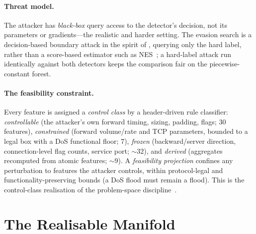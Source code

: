\documentclass[10pt,twocolumn]{article}
\begin{document}
\paragraph{Threat model.}
The attacker has \emph{black-box} query access to the detector's decision, not its
parameters or gradients---the realistic and harder setting. The evasion search is
a decision-based boundary attack in the spirit of
\cite{brendel2018boundary,chen2020hopskipjump}, querying only the hard label,
rather than a score-based estimator such as NES~\cite{ilyas2018blackbox}; a
hard-label attack run identically against both detectors keeps the comparison
fair on the piecewise-constant forest.

\paragraph{The feasibility constraint.}
Every feature is assigned a \emph{control class} by a header-driven rule
classifier: \emph{controllable} (the attacker's own forward timing, sizing,
padding, flags; $30$ features), \emph{constrained} (forward volume/rate and TCP
parameters, bounded to a legal box with a DoS functional floor; $7$),
\emph{frozen} (backward/server direction, connection-level flag counts, service
port; $\sim$$32$), and \emph{derived} (aggregates recomputed from atomic features;
$\sim$$9$). A \emph{feasibility projection} confines any perturbation to features
the attacker controls, within protocol-legal and functionality-preserving bounds
(a DoS flood must remain a flood). This is the control-class realisation of the
problem-space discipline~\cite{pierazzi2020problemspace,apruzzese2022realistic}.

\section{The Realisable Manifold}
\label{sec:manifold}
\end{document}
